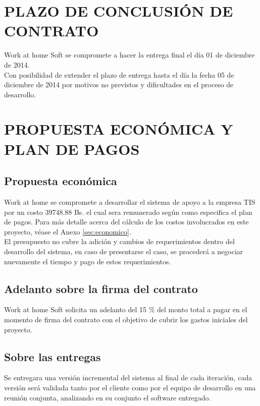 \documentclass[11pt,letterpaper]{report}
\begin{document}
\chapter{PLAZO DE CONCLUSIÓN DE CONTRATO}
Work at home Soft se compromete a hacer la entrega final el día 01 de diciembre de 2014.\\
Con posibilidad de extender el plazo de entrega hasta el día la fecha 05 de diciembre de 2014 por motivos no previstos y dificultades en el proceso de desarrollo.

\chapter{PROPUESTA ECONÓMICA Y PLAN DE PAGOS}

\section{Propuesta económica}

Work at home se compromete a desarrollar el sistema de apoyo a la empresa TIS por un costo 39748.88 Bs. el cual sera remunerado según como especifica el plan de pagos.
Para más detalle acerca del cálculo de los costos involucrados en este proyecto, véase el Anexo \ref{sec:economico}.\\
El presupuesto no cubre la adición y cambios de requerimientos dentro del desarrollo del sistema, en caso de presentarse el caso, se procederá a  negociar nuevamente el tiempo y pago de estos requerimientos.

\section{Adelanto sobre la firma del contrato}

Work at home Soft solicita un adelanto del 15 \% del monto total a pagar en el momento de firma del contrato con el objetivo de cubrir los gastos iniciales del proyecto.

\section{Sobre las entregas}
Se entregara una versión incremental del sistema al final de cada iteración, cada versión será validada tanto por el cliente como por el equipo de desarrollo en una reunión conjunta, analizando en su conjunto el software entregado.
\end{document}
